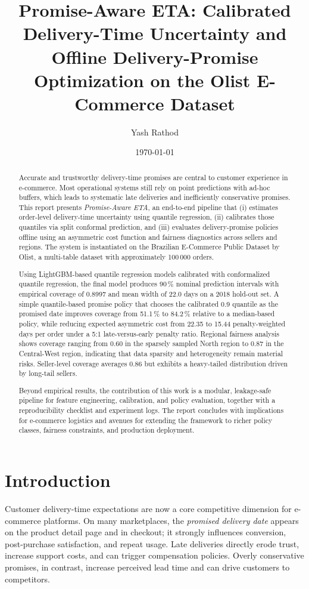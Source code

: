 \documentclass[10pt,twocolumn]{article}
\title{Promise-Aware ETA: Calibrated Delivery-Time Uncertainty and Offline Delivery-Promise Optimization on the Olist E-Commerce Dataset}
\author{
  Yash Rathod
}
\date{\today}
\begin{document}
\maketitle

\begin{abstract}
Accurate and trustworthy delivery-time promises are central to customer experience in e-commerce. Most operational systems still rely on point predictions with ad-hoc buffers, which leads to systematic late deliveries and inefficiently conservative promises. This report presents \emph{Promise-Aware ETA}, an end-to-end pipeline that (i) estimates order-level delivery-time uncertainty using quantile regression, (ii) calibrates those quantiles via split conformal prediction, and (iii) evaluates delivery-promise policies offline using an asymmetric cost function and fairness diagnostics across sellers and regions. The system is instantiated on the Brazilian E-Commerce Public Dataset by Olist, a multi-table dataset with approximately 100\,000 orders.

Using LightGBM-based quantile regression models calibrated with conformalized quantile regression, the final model produces 90\,\% nominal prediction intervals with empirical coverage of 0.8997 and mean width of 22.0 days on a 2018 hold-out set. A simple quantile-based promise policy that chooses the calibrated 0.9 quantile as the promised date improves coverage from 51.1\,\% to 84.2\,\% relative to a median-based policy, while reducing expected asymmetric cost from 22.35 to 15.44 penalty-weighted days per order under a 5:1 late-versus-early penalty ratio. Regional fairness analysis shows coverage ranging from 0.60 in the sparsely sampled North region to 0.87 in the Central-West region, indicating that data sparsity and heterogeneity remain material risks. Seller-level coverage averages 0.86 but exhibits a heavy-tailed distribution driven by long-tail sellers.

Beyond empirical results, the contribution of this work is a modular, leakage-safe pipeline for feature engineering, calibration, and policy evaluation, together with a reproducibility checklist and experiment logs. The report concludes with implications for e-commerce logistics and avenues for extending the framework to richer policy classes, fairness constraints, and production deployment.
\end{abstract}

\section{Introduction}
Customer delivery-time expectations are now a core competitive dimension for e-commerce platforms. On many marketplaces, the \emph{promised delivery date} appears on the product detail page and in checkout; it strongly influences conversion, post-purchase satisfaction, and repeat usage. Late deliveries directly erode trust, increase support costs, and can trigger compensation policies. Overly conservative promises, in contrast, increase perceived lead time and can drive customers to competitors.
\end{document}
